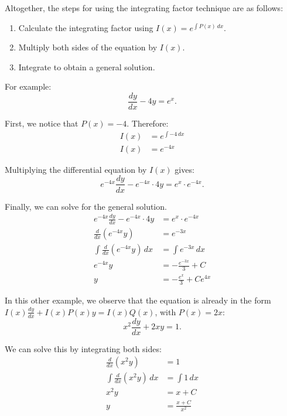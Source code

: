 \documentclass[12pt]{article}
\begin{document}
Altogether, the steps for using the integrating factor technique are as follows:
\begin{enumerate}
	\item Calculate the integrating factor using $I(x) = e^{\int P(x) \, dx}$.
	\item Multiply both sides of the equation by $I(x)$.
	\item Integrate to obtain a general solution.
\end{enumerate}

For example:
\[ \frac{dy}{dx} - 4y = e^x. \]

First, we notice that $P(x) = -4$. Therefore:
\begin{align*}
	I(x) & = e^{\int -4 \, dx} \\
	I(x) & = e^{-4x}
\end{align*}

Multiplying the differential equation by $I(x)$ gives:
\[ e^{-4x} \frac{dy}{dx} - e^{-4x} \cdot 4y = e^x \cdot e^{-4x}. \]

Finally, we can solve for the general solution.
\begin{align*}
	e^{-4x} \frac{dy}{dx} - e^{-4x} \cdot 4y        & = e^x \cdot e^{-4x}         \\[6pt]
	\frac{d}{dx} \left( e^{-4x}y \right)            & = e^{-3x}                   \\[6pt]
	\int \frac{d}{dx} \left( e^{-4x}y \right) \, dx & = \int e^{-3x} \, dx        \\[6pt]
	e^{-4x}y                                        & = -\frac{e^{-3x}}{3} + C    \\[6pt]
	y                                               & = -\frac{e^x}{3} + C e^{4x}
\end{align*}

In this other example, we observe that the equation is already in the form $I(x) \frac{dy}{dx} + I(x) P(x)y = I(x) Q(x)$, with $P(x) = 2x$:
\[ x^2 \frac{dy}{dx} + 2xy = 1. \]

We can solve this by integrating both sides:
\begin{align*}
	\frac{d}{dx} \left( x^2 y \right)            & = 1                 \\[6pt]
	\int \frac{d}{dx} \left( x^2 y \right) \, dx & = \int 1 \, dx      \\[6pt]
	x^2 y                                        & = x + C             \\
	y                                            & = \frac{x + C}{x^2}
\end{align*}
\end{document}
